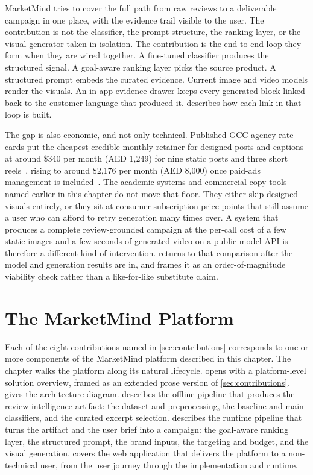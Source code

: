 \documentclass[12pt,a4paper]{report}
\begin{document}
MarketMind tries to cover the full path from raw reviews to a deliverable campaign in one place, with the evidence trail visible to the user. The contribution is not the classifier, the prompt structure, the ranking layer, or the visual generator taken in isolation. The contribution is the end-to-end loop they form when they are wired together. A fine-tuned classifier produces the structured signal. A goal-aware ranking layer picks the source product. A structured prompt embeds the curated evidence. Current image and video models render the visuals. An in-app evidence drawer keeps every generated block linked back to the customer language that produced it.  describes how each link in that loop is built.

The gap is also economic, and not only technical. Published GCC agency rate cards put the cheapest credible monthly retainer for designed posts and captions at around \$340 per month (AED 1,249) for nine static posts and three short reels~\cite{si3packages}, rising to around \$2,176 per month (AED 8,000) once paid-ads management is included~\cite{digitalwisepackages}. The academic systems and commercial copy tools named earlier in this chapter do not move that floor. They either skip designed visuals entirely, or they sit at consumer-subscription price points that still assume a user who can afford to retry generation many times over. A system that produces a complete review-grounded campaign at the per-call cost of a few static images and a few seconds of generated video on a public model API is therefore a different kind of intervention.  returns to that comparison after the model and generation results are in, and frames it as an order-of-magnitude viability check rather than a like-for-like substitute claim.


\chapter{The MarketMind Platform}
\label{ch:approach}

Each of the eight contributions named in \cref{sec:contributions} corresponds to one or more components of the MarketMind platform described in this chapter. The chapter walks the platform along its natural lifecycle.  opens with a platform-level solution overview, framed as an extended prose version of \cref{sec:contributions}.  gives the architecture diagram.  describes the offline pipeline that produces the review-intelligence artifact: the dataset and preprocessing, the baseline and main classifiers, and the curated excerpt selection.  describes the runtime pipeline that turns the artifact and the user brief into a campaign: the goal-aware ranking layer, the structured prompt, the brand inputs, the targeting and budget, and the visual generation.  covers the web application that delivers the platform to a non-technical user, from the user journey through the implementation and runtime.
\end{document}
